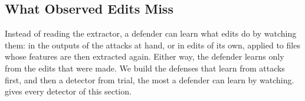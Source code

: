 
\subsection{What Observed Edits Miss}
\label{sec:eval:observed}

Instead of reading the extractor, a defender can learn what edits do by watching them: in the outputs of the attacks
at hand, or in edits of its own, applied to files whose features are then extracted again. Either way, the defender
learns only from the edits that were made. We build the defenses that learn from attacks first, and then a detector
from trial, the most a defender can learn by watching.  gives every detector of
this section.

